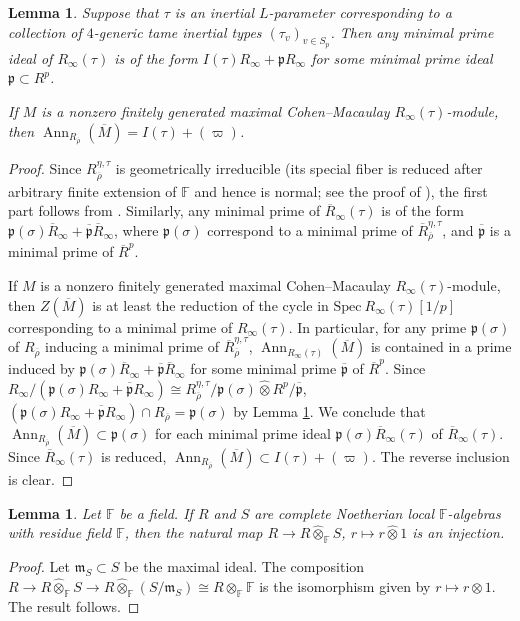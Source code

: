 \documentclass[oneside,a4paper,english, 11pt]{amsart}
\theoremstyle{plain}
\theoremstyle{plain}
\theoremstyle{plain}
\newtheorem{lemma}[thm]{Lemma}
\theoremstyle{plain}
\theoremstyle{plain}
\theoremstyle{plain}
\theoremstyle{definition}
\theoremstyle{definition}
\theoremstyle{definition}
\theoremstyle{remark}
\numberwithin{equation}{section}
\newcommand{\F}{\mathbb{F}}
\newcommand{\fp}{\mathfrak{p}}
\newcommand{\fm}{\mathfrak{m}}
\newcommand{\Spec}{\mathrm{Spec}\ }
\newcommand{\rhobar}{\overline{\rho}}
\newcommand{\ovl}[1]{\overline{#1}}
\DeclareMathOperator{\Ann}{Ann}
\newcommand{\ra}{\rightarrow}
\begin{document}
\begin{lemma}\label{lemma:prodcomp}
Suppose that $\tau$ is an inertial $L$-parameter corresponding to a collection of $4$-generic tame inertial types $(\tau_v)_{v\in S_p}$. 
Then any minimal prime ideal of $R_\infty(\tau)$ is of the form $I(\tau)  R_\infty+ \mathfrak{p}R_\infty$ for some minimal prime ideal $\mathfrak{p} \subset R^p$. 

If $M$ is a nonzero finitely generated maximal Cohen--Macaulay $R_\infty(\tau)$-module, then $\Ann_{R_{\rhobar}} (\ovl{M}) = I(\tau)+(\varpi)$. 
\end{lemma}
\begin{proof}
Since $R_{\rhobar}^{\eta,\tau}$ is geometrically irreducible (its special fiber is reduced after arbitrary finite extension of $\F$ and hence is normal; see the proof of \cite[Lemma 3.5.4]{LLLM2}), the first part follows from \cite[Lemma 3.3(5)]{BLGGHT2}. Similarly, any minimal prime of $\ovl{R}_\infty(\tau)$ is of the form $\fp(\sigma)  \ovl{R}_\infty+ \ovl{\fp}\ovl{R}_\infty$, where $\fp(\sigma)$ correspond to a minimal prime of $\ovl{R}^{\eta,\tau}_{\rhobar}$, and $\ovl{\fp}$ is a minimal prime of $\ovl{R}^p$.

If $M$ is a nonzero finitely generated maximal Cohen--Macaulay $R_\infty(\tau)$-module, then $Z(\ovl{M})$ is at least the reduction of the cycle in $\Spec R_\infty(\tau)[1/p]$ corresponding to a minimal prime of $R_\infty(\tau)$. 
In particular, for any prime $\fp(\sigma)$ of $R_{\rhobar}$ inducing a minimal prime of $\ovl{R}^{\eta,\tau}_{\rhobar}$, $\Ann_{R_\infty(\tau)} (\ovl{M})$ is contained in a prime induced by $\fp(\sigma) \ovl{R}_\infty+ \ovl{\fp} \ovl{R}_\infty$ for some minimal prime $\ovl{\fp}$ of $\ovl{R}^p$. 
Since $R_\infty/(\fp(\sigma) R_\infty+ \ovl{\fp} R_\infty) \cong R_{\rhobar}^{\eta,\tau}/\fp(\sigma) \widehat{\otimes} R^p/\ovl{\fp}$, $(\fp(\sigma) R_\infty+ \ovl{\fp} R_\infty) \cap R_{\rhobar} = \fp(\sigma)$ by Lemma \ref{lemma:completedtensor}. 
We conclude that $\Ann_{R_{\rhobar}} (\ovl{M}) \subset \fp(\sigma)$ for each minimal prime ideal $\fp(\sigma)\ovl{R}_\infty(\tau)$ of $\ovl{R}_\infty(\tau)$. 
Since $\ovl{R}_\infty(\tau)$ is reduced, $\Ann_{R_{\rhobar}} (\ovl{M}) \subset I(\tau)+(\varpi)$. 
The reverse inclusion is clear.
\end{proof}

\begin{lemma}\label{lemma:completedtensor}
Let $\F$ be a field. 
If $R$ and $S$ are complete Noetherian local $\F$-algebras with residue field $\F$, then the natural map $R \ra R \widehat{\otimes}_{\F} S$, $r\mapsto r \widehat{\otimes} 1$ is an injection.
\end{lemma}
\begin{proof}
Let $\fm_S \subset S$ be the maximal ideal. 
The composition $R \ra R \widehat{\otimes}_{\F} S \ra R \widehat{\otimes}_{\F} (S/\fm_S) \cong R \otimes_{\F} \F$ is the isomorphism given by $r \mapsto r\otimes 1$. 
The result follows. 
\end{proof}
\end{document}
